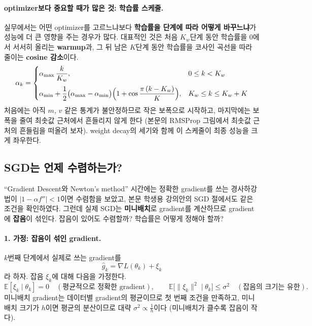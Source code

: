 \documentclass[11pt,a4paper]{article}
\begin{document}
\paragraph{optimizer보다 중요할 때가 많은 것: 학습률 스케줄.}
실무에서는 어떤 optimizer를 고르느냐보다 \textbf{학습률을 단계에 따라 어떻게 바꾸느냐}가
성능에 더 큰 영향을 주는 경우가 많다. 대표적인 것은
처음 $K_w$단계 동안 학습률을 $0$에서 서서히 올리는 \textbf{warmup}과,
그 뒤 남은 $K$단계 동안 학습률을 코사인 곡선을 따라 줄이는 \textbf{cosine 감소}이다.
\[
\alpha_k=
\begin{cases}
\alpha_{\max}\,\dfrac{k}{K_w}, & 0\le k<K_w\\[10pt]
\alpha_{\min}+\dfrac12\bigl(\alpha_{\max}-\alpha_{\min}\bigr)\Bigl(1+\cos\dfrac{\pi\,(k-K_w)}{K}\Bigr), & K_w\le k\le K_w+K
\end{cases}
\]
처음에는 아직 $m$, $v$ 같은 통계가 불안정하므로 작은 보폭으로 시작하고,
마지막에는 보폭을 줄여 최솟값 근처에서 흔들리지 않게 한다
(본문의 RMSProp 그림에서 최솟값 근처의 흔들림을 떠올려 보자).
weight decay의 세기와 함께 이 스케줄이 최종 성능을 크게 좌우한다.

\subsection{SGD는 언제 수렴하는가?}\label{app:sgdconv}

``Gradient Descent와 Newton's method'' 시간에는 정확한 gradient를 쓰는 경사하강법이
$|1-\alpha f''|<1$이면 수렴함을 보았고, 본문 학생용 강의안의 SGD 절에서도 같은 조건을 확인하였다.
그런데 실제 SGD는 \textbf{미니배치}로 gradient를 계산하므로 gradient에 \textbf{잡음}이 섞인다.
잡음이 있어도 수렴할까? 학습률은 어떻게 정해야 할까?

\paragraph{1. 가정: 잡음이 섞인 gradient.}
$k$번째 단계에서 실제로 쓰는 gradient를
\[
\hat g_k=\nabla L(\theta_k)+\xi_k
\]
라 하자. 잡음 $\xi_k$에 대해 다음을 가정한다.
\[
\mathbb E[\xi_k\mid\theta_k]=0\quad(\text{평균적으로 정확한 gradient}),
\qquad
\mathbb E\bigl[\|\xi_k\|^2\mid\theta_k\bigr]\le\sigma^2\quad(\text{잡음의 크기는 유한}).
\]
미니배치 gradient는 데이터별 gradient의 평균이므로 첫 번째 조건을 만족하고,
미니배치 크기가 $h$이면 평균의 분산이므로 대략 $\sigma^2\propto\frac1h$이다
(미니배치가 클수록 잡음이 작다).
\end{document}
